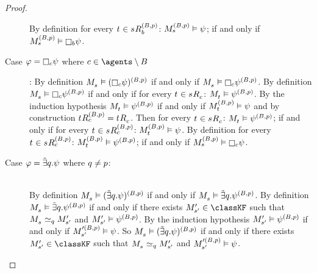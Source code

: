 \begin{proof}
\begin{description}
        By definition for every $\kStateT \in \kSuccessorsB[(\agentsB, \atomP)]{\kStateS}$: $\kPModel[(\agentsB, \atomP)]{\kStateS} \entails \psi$; if and only if $\kPModel[(\agentsB, \atomP)]{\kStateS} \entails \necessaryB \psi$.
\pagebreak
    \item[Case $\phi = \necessaryC \psi$ where $\agentC \in \agents \setminus \agentsB$]:
        By definition $\kPModel{\kStateS} \entails (\necessaryC \psi)^{(\agentsB, \atomP)}$ if and only if $\kPModel{\kStateS} \entails \necessaryC \psi^{(\agentsB, \atomP)}$.
        By definition $\kPModel{\kStateS} \entails \necessaryC \psi^{(\agentsB, \atomP)}$ if and only if for every $\kStateT \in \kSuccessorsC{\kStateS}$: $\kPModel{\kStateT} \entails \psi^{(\agentsB, \atomP)}$.
        By the induction hypothesis $\kPModel{\kStateT} \entails \psi^{(\agentsB, \atomP)}$ if and only if $\kPModel[(\agentsB, \atomP)]{\kStateT} \entails \psi$ and by construction $\kSuccessorsC[(\agentsB, \atomP)]{\kStateT} = \kSuccessorsC{\kStateT}$.
        Then for every $\kStateT \in \kSuccessorsC{\kStateS}$: $\kPModel{\kStateT} \entails \psi^{(\agentsB, \atomP)}$; if and only if for every $\kStateT \in \kSuccessorsC[(\agentsB, \atomP)]{\kStateS}$: $\kPModel[(\agentsB, \atomP)]{\kStateT} \entails \psi$.
        By definition for every $\kStateT \in \kSuccessorsC[(\agentsB, \atomP)]{\kStateS}$: $\kPModel[(\agentsB, \atomP)]{\kStateT} \entails \psi^{(\agentsB, \atomP)}$; if and only if $\kPModel[(\agentsB, \atomP)]{\kStateS} \entails \necessaryC \psi$. 
    \item[Case $\phi = \somebisimsQ \psi$ where $\atomQ \neq \atomP$:] \hfill\\
        By definition $\kPModel{\kStateS} \entails (\somebisimsQ \psi)^{(\agentsB, \atomP)}$ if and only if $\kPModel{\kStateS} \entails \somebisimsQ \psi^{(\agentsB, \atomP)}$.
        By definition $\kPModel{\kStateS} \entails \somebisimsQ \psi^{(\agentsB, \atomP)}$ if and only if there exists $\kPModelP{\kStateSP} \in \classKF$ such that $\kPModel{\kStateS} \bisimilar[\atomQ] \kPModelP{\kStateSP}$ and $\kPModelP{\kStateSP} \entails \psi^{(\agentsB, \atomP)}$.
        By the induction hypothesis $\kPModelP{\kStateSP} \entails \psi^{(\agentsB, \atomP)}$ if and only if $\kPModel[\prime(\agentsB, \atomP)]{\kStateSP} \entails \psi$.
        So $\kPModel{\kStateS} \entails (\somebisimsQ \psi)^{(\agentsB, \atomP)}$ if and only if there exists $\kPModelP{\kStateSP} \in \classKF$ such that $\kPModel{\kStateS} \bisimilar[\atomQ] \kPModelP{\kStateSP}$ and $\kPModel[\prime(\agentsB, \atomP)]{\kStateSP} \entails \psi$.


\end{description}
\end{proof}
